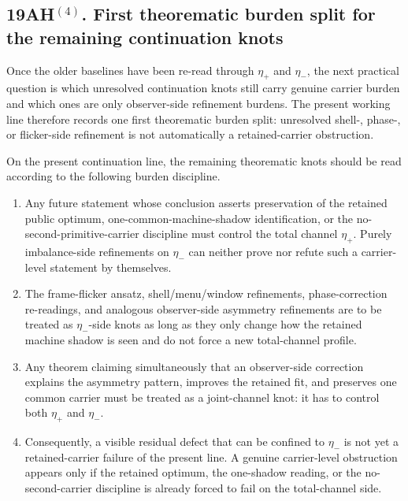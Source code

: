 \subsection*{19AH$^{(4)}$. First theorematic burden split for the remaining continuation knots}
Once the older baselines have been re-read through \(\eta_+\) and \(\eta_-\), the next practical question is which unresolved continuation knots still carry genuine carrier burden and which ones are only observer-side refinement burdens. The present working line therefore records one first theorematic burden split: unresolved shell-, phase-, or flicker-side refinement is not automatically a retained-carrier obstruction.

\begin{proposition}
On the present continuation line, the remaining theorematic knots should be read according to the following burden discipline.
\begin{enumerate}[leftmargin=2em]
  \item Any future statement whose conclusion asserts preservation of the retained public optimum, one-common-machine-shadow identification, or the no-second-primitive-carrier discipline must control the total channel \(\eta_+\). Purely imbalance-side refinements on \(\eta_-\) can neither prove nor refute such a carrier-level statement by themselves.
  \item The frame-flicker ansatz, shell/menu/window refinements, phase-correction re-readings, and analogous observer-side asymmetry refinements are to be treated as \(\eta_-\)-side knots as long as they only change how the retained machine shadow is seen and do not force a new total-channel profile.
  \item Any theorem claiming simultaneously that an observer-side correction explains the asymmetry pattern, improves the retained fit, and preserves one common carrier must be treated as a joint-channel knot: it has to control both \(\eta_+\) and \(\eta_-\).
  \item Consequently, a visible residual defect that can be confined to \(\eta_-\) is not yet a retained-carrier failure of the present line. A genuine carrier-level obstruction appears only if the retained optimum, the one-shadow reading, or the no-second-carrier discipline is already forced to fail on the total-channel side.
\end{enumerate}
\end{proposition}

